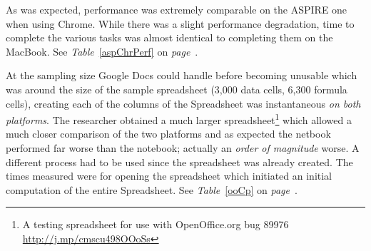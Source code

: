 As was expected, performance was extremely comparable on the ASPIRE one when
using Chrome.  While there was a slight performance degradation, time to
complete the various tasks was almost identical to completing them on the
MacBook.  See \emph{Table}~\ref{aspChrPerf} on \emph{page}~\pageref{aspChrPerf}.



At the sampling size Google Docs could handle before becoming unusable which was
around the size of the sample spreadsheet (3,000 data cells, 6,300 formula
cells), creating each of the columns of the Spreadsheet was instantaneous
\emph{on both platforms}.  The researcher obtained a much larger
spreadsheet\footnote{A testing spreadsheet for use with OpenOffice.org bug 89976
  \url{http://j.mp/cmscu498OOoSs}} which allowed a much closer comparison of the
two platforms and as expected the netbook performed far worse than the notebook;
actually an \emph{order of magnitude} worse.  A different process had to be used
since the spreadsheet was already created.  The times measured were for opening
the spreadsheet which initiated an initial computation of the entire
Spreadsheet.  See \emph{Table}~\ref{ooCp} on \emph{page}~\pageref{ooCp}.



